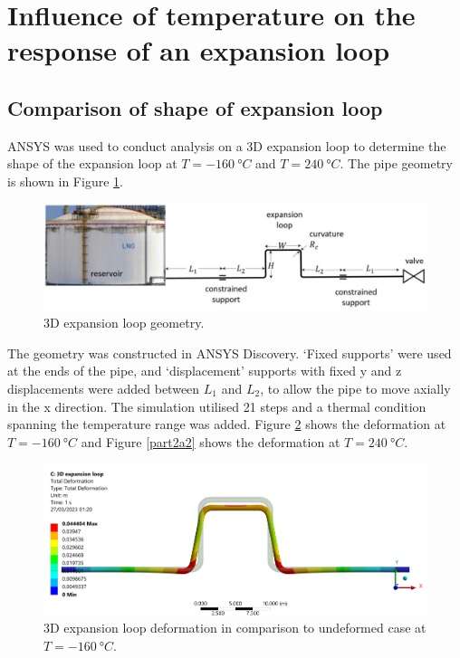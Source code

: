 \section{Influence of temperature on the response of an expansion loop}
\subsection{Comparison of shape of expansion loop}
ANSYS was used to conduct analysis on a 3D expansion loop to determine the shape of the expansion loop at $T = \SI{-160}{\degree C}$ and $T = \SI{240}{\degree C}$. The pipe geometry is shown in Figure \ref{part2a3}.
\begin{figure}[H]
    \centering
    \includegraphics[width = \textwidth]{img/part2a-3.png}
    \caption{3D expansion loop geometry.}
    \label{part2a3}
\end{figure}
The geometry was constructed in ANSYS Discovery. `Fixed supports' were used at the ends of the pipe, and `displacement' supports with fixed y and z displacements were added between $L_1$ and $L_2$, to allow the pipe to move axially in the x direction. The simulation utilised 21 steps and a thermal condition spanning the temperature range was added. Figure \ref{part2a1} shows the deformation at $T = \SI{-160}{\degree C}$ and Figure \ref{part2a2} shows the deformation at $T = \SI{240}{\degree C}$.
\begin{figure}[H]
    \centering
    \includegraphics[width = \textwidth]{img/part2a-1.png}
    \caption{3D expansion loop deformation in comparison to undeformed case at $T = \SI{-160}{\degree C}$.}
    \label{part2a1}
\end{figure}
